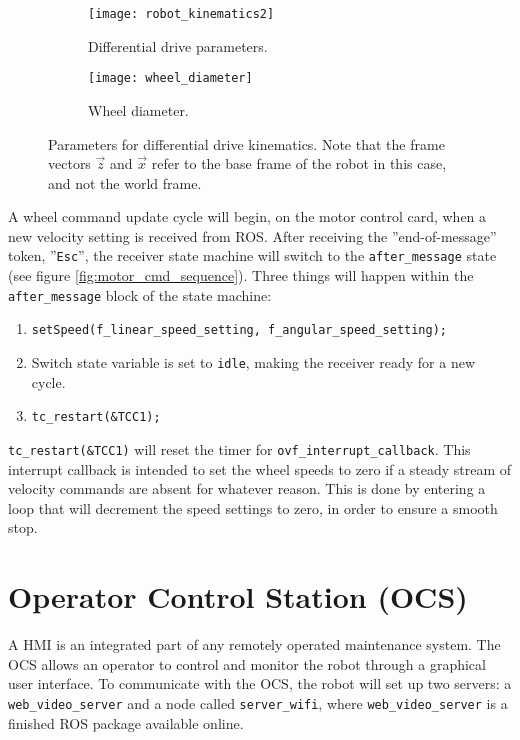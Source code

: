  \begin{figure}[H]
 	\centering
 	\begin{subfigure}[b]{0.58\textwidth}
 		\texttt{[image: robot\_kinematics2]}
 		\caption{Differential drive parameters.}
 		\label{fig:robot_kinematics}
 	\end{subfigure}
 	\begin{subfigure}[b]{0.38\textwidth}
 		
 		\texttt{[image: wheel\_diameter]}
 		\caption{Wheel diameter.}
 		\label{fig:wheel_diameter}
 	\end{subfigure}
 	\caption{\label{fig:wheel_diameter}Parameters for differential drive kinematics. Note that the frame vectors $\vec{z}$ and $\vec{x}$ refer to the base frame of the robot in this case, and not the world frame.}
 \end{figure}

A wheel command update cycle will begin, on the motor control card, when a new velocity setting is received from \ac{ROS}. After receiving the ''end-of-message'' token, ''\texttt{Esc}'', the receiver state machine will switch to the \texttt{after\_message} state (see figure \ref{fig:motor_cmd_sequence}). Three things will happen within the \texttt{after\_message} block of the state machine:

\begin{enumerate}
	\item \texttt{setSpeed(f\_linear\_speed\_setting, f\_angular\_speed\_setting);}
	\item Switch state variable is set to \texttt{idle}, making the receiver ready for a new cycle.
	\item \texttt{tc\_restart(\&TCC1);}
\end{enumerate}

\texttt{tc\_restart(\&TCC1)} will reset the timer for \texttt{ovf\_interrupt\_callback}. This interrupt callback is intended to set the wheel speeds to zero if a steady stream of velocity commands are absent for whatever reason. This is done by entering a loop that will decrement the speed settings to zero, in order to ensure a smooth stop.

\section{Operator Control Station (OCS)}

A \ac{HMI} is an integrated part of any remotely operated maintenance system. The \ac{OCS} allows an operator to control and monitor the robot through a graphical user interface. To communicate with the \ac{OCS}, the robot will set up two servers: a \texttt{web\_video\_server} and a node called \texttt{server\_wifi}, where \texttt{web\_video\_server} is a finished \ac{ROS} package available online.

